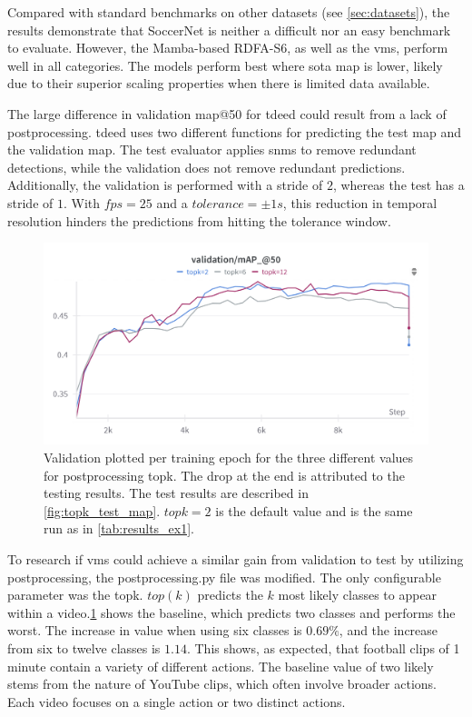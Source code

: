 Compared with standard benchmarks on other datasets (see \cref{sec:datasets}), the results demonstrate that SoccerNet is neither a difficult nor an easy benchmark to evaluate. However, the Mamba-based RDFA-S6, as well as the \acrshort{vms}, perform well in all categories. The models perform best where \acrlong{sota} \acrshort{map} is lower, likely due to their superior scaling properties when there is limited data available. 

The large difference in validation \acrshort{map}@50 for \acrshort{tdeed} could result from a lack of postprocessing. \acrshort{tdeed} uses two different functions for predicting the test \acrshort{map} and the validation \acrshort{map}. The test evaluator applies \acrfull{snms} to remove redundant detections, while the validation does not remove redundant predictions. Additionally, the validation is performed with a stride of \(2\), whereas the test has a stride of \(1\). With \(fps=25\) and a \(tolerance = \pm1s\), this reduction in temporal resolution hinders the predictions from hitting the tolerance window. 

\begin{figure}[h]
    \centering
    \includegraphics[width=\linewidth]{figures/valid_topk_2.png}
    \caption{Validation plotted per training epoch for the three different values for postprocessing topk. The drop at the end is attributed to the testing results. The test results are described in \cref{fig:topk_test_map}. \(topk=2\) is the default value and is the same run as in \cref{tab:results_ex1}.}
    \label{fig:topk}
\end{figure}

To research if \acrshort{vms} could achieve a similar gain from validation to test by utilizing postprocessing, the postprocessing.py file was modified. The only configurable parameter was the topk. $top (k)$ predicts the $k$ most likely classes to appear within a video.\cref{fig:topk} shows the baseline, which predicts two classes and performs the worst. The increase in value when using six classes is $0.69\%$, and the increase from six to twelve classes is $1.14$. This shows, as expected, that football clips of 1 minute contain a variety of different actions. The baseline value of two likely stems from the nature of YouTube clips, which often involve broader actions. Each video focuses on a single action or two distinct actions. 


